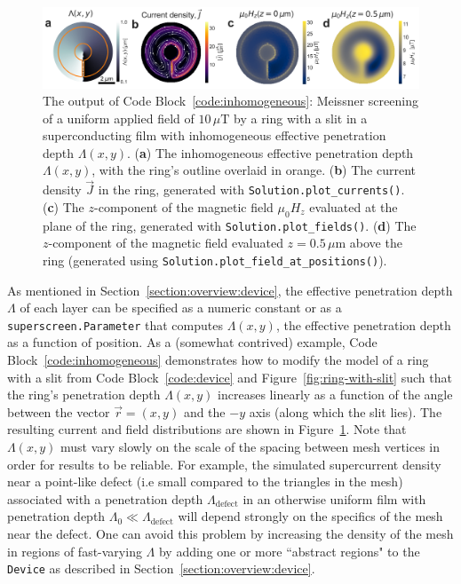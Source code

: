 \documentclass[final,3p,times,twocolumn]{elsarticle}
\newcommand{\inline}[1]{\texttt{#1}\xspace}
\newcommand{\um}{\mu\mathrm{m}}
\begin{document}
\begin{figure}[h!]
    \centering
    \includegraphics[width=\textwidth]{examples/images/ring_with_slit_inhomogeneous.pdf}
    \caption{The output of Code Block~\ref{code:inhomogeneous}: Meissner screening of a uniform applied field of $10\,\mu\mathrm{T}$ by a ring with a slit in a superconducting film with inhomogeneous effective penetration depth $\Lambda(x, y)$. ({\bf a}) The inhomogeneous effective penetration depth $\Lambda(x, y)$, with the ring's outline overlaid in orange. ({\bf b}) The current density $\vec{J}$ in the ring, generated with \inline{Solution.plot_currents()}. ({\bf c}) The $z$-component of the magnetic field $\mu_0H_z$ evaluated at the plane of the ring, generated with \inline{Solution.plot_fields()}. ({\bf d}) The $z$-component of the magnetic field evaluated $z=0.5\,\um$ above the ring (generated using \inline{Solution.plot_field_at_positions()}).}
    \label{fig:inhomogeneous}
\end{figure}

As mentioned in Section~\ref{section:overview:device}, the effective penetration depth $\Lambda$ of each layer can be specified as a numeric constant or as a \inline{superscreen.Parameter} that computes $\Lambda(x, y)$, the effective penetration depth as a function of position. As a (somewhat contrived) example, Code Block~\ref{code:inhomogeneous} demonstrates how to modify the model of a ring with a slit from Code Block~\ref{code:device} and Figure~\ref{fig:ring-with-slit} such that the ring's penetration depth $\Lambda(x, y)$ increases linearly as a function of the angle between the vector $\vec{r} = (x, y)$ and the $-y$ axis (along which the slit lies). The resulting current and field distributions are shown in Figure~\ref{fig:inhomogeneous}. Note that $\Lambda(x, y)$ must vary slowly on the scale of the spacing between mesh vertices in order for results to be reliable. For example, the simulated supercurrent density near a point-like defect (i.e small compared to the triangles in the mesh) associated with a penetration depth $\Lambda_\text{defect}$ in an otherwise uniform film with penetration depth $\Lambda_0\ll\Lambda_\text{defect}$ will depend strongly on the specifics of the mesh near the defect. One can avoid this problem by increasing the density of the mesh in regions of fast-varying $\Lambda$ by adding one or more ``abstract regions" to the \inline{Device} as described in Section~\ref{section:overview:device}.
 
\end{document}
